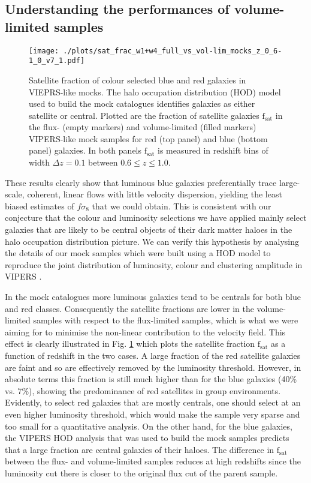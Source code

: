 \documentclass[longauth]{aa}
\begin{document}
\subsection{Understanding the performances of volume-limited samples}
    \begin{figure}
    \centering
    	\texttt{[image: ./plots/sat\_frac\_w1+w4\_full\_vs\_vol-lim\_mocks\_z\_0\_6-1\_0\_v7\_1.pdf]}
    	\caption{Satellite fraction of colour selected blue and red galaxies in VIEPRS-like mocks. The halo occupation distribution (HOD) model used to build the mock catalogues identifies galaxies as either satellite or central. Plotted are the fraction of satellite galaxies $\mathrm{f_{sat}}$ in the flux- (empty markers) and volume-limited (filled markers) VIPERS-like mock samples for red (top panel) and blue (bottom panel) galaxies. In both panels $\mathrm{f_{sat}}$ is measured in redshift bins of width $\Delta z=0.1$ between $0.6\le z\le1.0$.}\label{fig:sat_frac_mocks}
    \end{figure}
These results clearly show that luminous blue galaxies preferentially trace large-scale, coherent, linear flows with little velocity dispersion, yielding the least biased estimates of $f\sigma_8$ that we could obtain.  This is consistent with our conjecture that the colour and luminosity selections we have applied mainly select galaxies that are likely to be central objects of their dark matter haloes in the halo occupation distribution picture.  We can verify this hypothesis by analysing the details of our mock samples which were built using a HOD model to reproduce the joint distribution of luminosity, colour and clustering amplitude in VIPERS \citep{delatorre13a}.

In the mock catalogues more luminous galaxies tend to be centrals for both blue and red classes.  Consequently the satellite fractions are lower in the volume-limited samples with respect to the flux-limited samples, which is what we were aiming for to minimise the non-linear contribution to the velocity field. This effect is clearly illustrated in Fig. \ref{fig:sat_frac_mocks} which plots the satellite fraction $\mathrm{f_{sat}}$ as a function of redshift in the two cases. A large fraction of the red satellite galaxies are faint and so are effectively removed by the luminosity threshold. However, in absolute terms this fraction is still much higher than for the blue galaxies (40\% vs. 7\%), showing the predominance of red satellites in group environments.  Evidently, to select red galaxies that are mostly centrals, one should select at an even higher luminosity threshold, which would make the sample very sparse and too small for a quantitative analysis. On the other hand, for the blue galaxies, the VIPERS HOD analysis that was used to build the mock samples predicts that a large fraction are central galaxies of their haloes. The difference in $\mathrm{f_{sat}}$ between the flux- and volume-limited samples reduces at high redshifts since the luminosity cut there is closer to the original flux cut of the parent sample.
\end{document}
